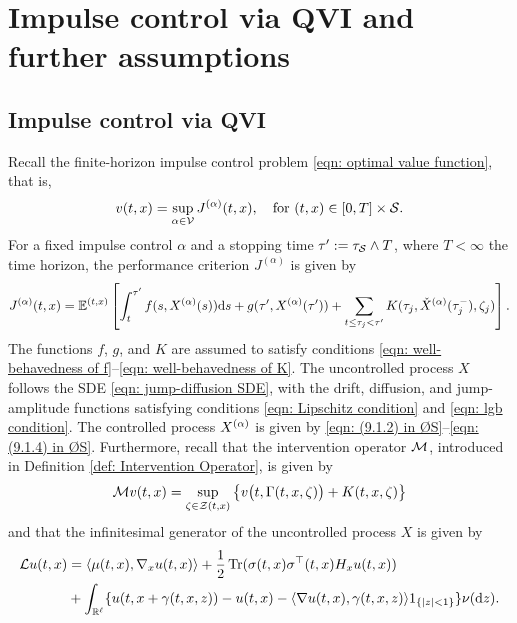 \section{Impulse control via QVI and further assumptions}
\label{section: Impulse Control via QVI and Further Assumptions}
\subsection{Impulse control via QVI}
Recall the finite-horizon impulse control problem \eqref{eqn: optimal value function}, that is,
\begin{equation}
    v(t,x) = \sup_{\alpha \in \mathcal{V}} J^{(\alpha)}(t,x), \quad \text{for } (t,x)\in [0,T]\times \mathcal{S}.
    \label{eqn: impulse control problem}
\end{equation}
For a fixed impulse control $\alpha$ and a stopping time $\tau':=\tau_{\mathcal{S}} \wedge T$, where $T<\infty$ the time horizon, the performance criterion $J^{(\alpha)}$ is given by
\begin{equation*}
    J^{(\alpha)}(t,x) = \mathbb{E}^{(t,x)} \left[ \int_t^{\tau'} f(s,X^{(\alpha)}(s)) \mathrm{d} s + g(\tau', X^{(\alpha)}(\tau')) + \sum_{t \leq \tau_j < \tau'} K(\tau_j, \check{X}^{(\alpha)}(\tau_j^-), \zeta_j) \right].
\end{equation*}
The functions $f$, $g$, and $K$ are assumed to satisfy conditions \eqref{eqn: well-behavedness of f}–\eqref{eqn: well-behavedness of K}. The uncontrolled process $X$ follows the SDE \eqref{eqn: jump-diffusion SDE}, with the drift, diffusion, and jump-amplitude functions satisfying conditions \eqref{eqn: Lipschitz condition} and \eqref{eqn: lgb condition}. The controlled process $X^{(\alpha)}$ is given by \eqref{eqn: (9.1.2) in ØS}--\eqref{eqn: (9.1.4) in ØS}. Furthermore, recall that the intervention operator $\mathcal{M}$, introduced in Definition \ref{def: Intervention Operator}, is given by
\begin{equation*}
    \mathcal{M} v(t,x) = \sup_{\zeta \in \mathcal{Z}(t,x)} \big\{ v\big(t,\Gamma(t,x,\zeta)\big) + K(t,x,\zeta) \big\}
\end{equation*}
and that the infinitesimal generator of the uncontrolled process $X$ is given by
\begin{align}
    \mathcal{L} u(t,x) &= \langle \mu(t,x), \nabla_x u(t,x) \rangle + \frac{1}{2} \operatorname{Tr} (\sigma(t,x)\sigma^\top(t,x)H_xu(t,x)) \nonumber\\
    &+ \int_{\mathbb{R}^\ell} \{u(t,x+\gamma(t,x,z)) - u(t,x) - \langle \nabla u(t,x), \gamma(t,x,z) \rangle 1_{\left\{|z|<1\right\}}\} \nu(\mathrm{d} z).
    \label{eqn: infinitesimal generator (short form)}
\end{align}
